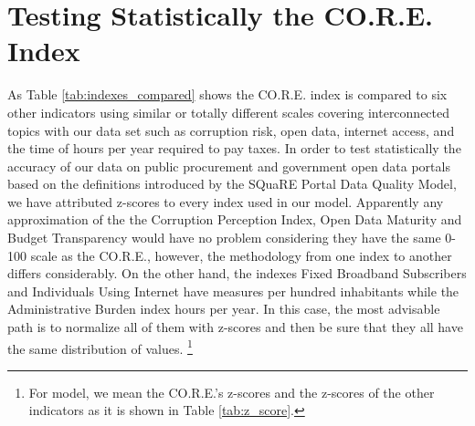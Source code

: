 \documentclass[a4paper, twoside]{report}
\let\oldfootnote\footnote
\renewcommand\footnote[1]{%
\oldfootnote{\hspace{2mm}#1}}
\begin{document}
\section{Testing Statistically the CO.R.E. Index}

As Table \ref{tab:indexes_compared} shows the CO.R.E. index is compared to six other indicators using similar or totally different scales covering interconnected topics with our data set such as corruption risk, open data, internet access, and the time of hours per year required to pay taxes. In order to test statistically the accuracy of our data on public procurement and government open data portals based on the definitions introduced by the SQuaRE Portal Data Quality Model, we have attributed z-scores to every index used in our model. Apparently any approximation of the the Corruption Perception Index, Open Data Maturity and Budget Transparency would have no problem considering they have the same 0-100 scale as the CO.R.E., however, the methodology from one index to another differs considerably. On the other hand, the indexes Fixed Broadband Subscribers and Individuals Using Internet have measures per hundred inhabitants while the Administrative Burden index hours per year. In this case, the most advisable path is to normalize all of them with z-scores and then be sure that they all have the same distribution of values.\footnote{For model, we mean the CO.R.E.'s z-scores and the z-scores of the other indicators as it is shown in Table \ref{tab:z_score}.} 
\end{document}
